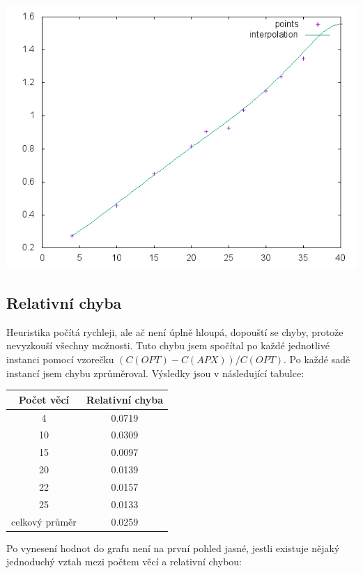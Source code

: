 \documentclass[12pt,a4paper]{article}
\begin{document}
\begin{center}
\includegraphics[width=\textwidth]{simpleheur}
\end{center}



\subsection{Relativní chyba}

Heuristika počítá rychleji, ale ač není úplně hloupá, dopouští se chyby, protože nevyzkouší všechny možnosti. 
Tuto chybu jsem spočítal po každé jednotlivé instanci pomocí vzorečku $( C(OPT)-C(APX) ) / C(OPT)$.
Po každé sadě instancí jsem chybu zprůměroval. Výsledky jsou v následující tabulce:

\begin{center}
\begin{tabular}{|c|c|}
\hline
Počet věcí & Relativní chyba \\
\hline\hline
4 & 0.0719 \\
\hline
10 & 0.0309 \\
\hline
15 & 0.0097 \\
\hline
20 & 0.0139 \\
\hline
22 & 0.0157 \\
\hline
25 & 0.0133 \\
\hline\hline
celkový průměr & 0.0259 \\
\hline
\end{tabular}
\end{center}

Po vynesení hodnot do grafu není na první pohled jasné,
jestli existuje nějaký jednoduchý vztah mezi počtem věcí a relativní chybou:
\end{document}
